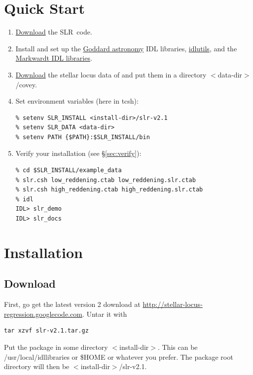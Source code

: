 \documentclass{report}
\newcommand{\slr}{SLR}
\begin{document}
\chapter{Quick Start}


\begin{enumerate}
\item \href{http://stellar-locus-regression.googlecode.com}{Download}
  the \slr\ code.
\item Install and set up the \href{http://idlastro.gsfc.nasa.gov}{Goddard
    astronomy} IDL libraries,
  \href{http://www.astro.princeton.edu/~schlegel/code.html}{idlutils},
  and the \href{http://www.physics.wisc.edu/~craigm/idl}{Markwardt IDL
    libraries}.
\item
  \href{http://www.cfa.harvard.edu/~kcovey/research/medianlocus.tbl}{Download}
  the stellar locus data of \citet{bib:covey} and put them in a
  directory $<$data-dir$>$/covey.
\item Set environment variables (here in tcsh):
\begin{verbatim}
% setenv SLR_INSTALL <install-dir>/slr-v2.1
% setenv SLR_DATA <data-dir>
% setenv PATH {$PATH}:$SLR_INSTALL/bin
\end{verbatim}
\item Verify your installation (see \S\ref{sec:verify}):
\begin{verbatim}
% cd $SLR_INSTALL/example_data
% slr.csh low_reddening.ctab low_reddening.slr.ctab
% slr.csh high_reddening.ctab high_reddening.slr.ctab
% idl
IDL> slr_demo
IDL> slr_docs
\end{verbatim}
\end{enumerate}


\chapter{Installation}

\section{Download}

First, go get the latest version 2 download at
\url{http://stellar-locus-regression.googlecode.com}. Untar
it with
\begin{verbatim}
tar xzvf slr-v2.1.tar.gz
\end{verbatim}
Put the package in some directory $<$install-dir$>$. This can be
/usr/local/idllibraries or \$HOME or whatever you prefer. The
package root directory will then be $<$install-dir$>$/slr-v2.1.
\end{document}
